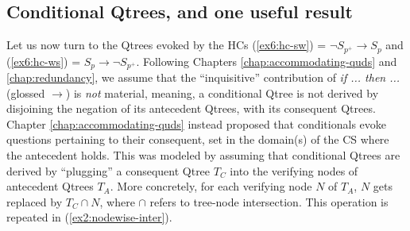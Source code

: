 


\subsection{Conditional Qtrees, and one useful result}

Let us now turn to the Qtrees evoked by the HCs (\ref{ex6:hc-sw}) = $\neg S_{p^+} \rightarrow S_{p}$  and (\ref{ex6:hc-ws}) = $S_p \rightarrow \neg S_{p^+}$. Following Chapters \ref{chap:accommodating-quds} and \ref{chap:redundancy}, we assume that the ``inquisitive'' contribution of \textit{if ... then ...} (glossed $\rightarrow$) is \textit{not} material, meaning, a conditional Qtree is not derived by disjoining the negation of its antecedent Qtrees, with its consequent Qtrees.\\


Chapter \ref{chap:accommodating-quds} instead proposed that conditionals evoke questions pertaining to their consequent, set in the domain(s) of the CS where the antecedent holds. This was modeled by assuming that conditional Qtrees are derived by ``plugging'' a consequent Qtree $T_C$ into the verifying nodes of antecedent Qtrees $T_A$. More concretely, for each verifying node $N$ of $T_A$, $N$ gets replaced by $T_C \cap N$, where $\cap$ refers to tree-node intersection. This operation is repeated in (\ref{ex2:nodewise-inter}). 

